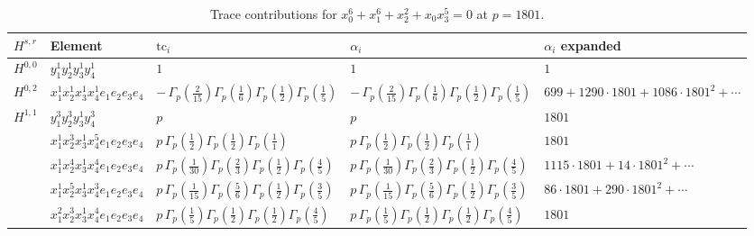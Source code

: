 \documentclass[11pt]{article}
\begin{document}
\begin{table}[ht]
\centering
\caption{Trace contributions for $x_0^{6} + x_1^{6} + x_2^{2} + x_0 x_3^{5} = 0$ at $p=1801$.}\label{tab:deformed-3}
\renewcommand{\arraystretch}{1.1}
{\scriptsize
\begin{tabular}{@{}lllll@{}}
\toprule
$H^{s,r}$ & Element & $\mathrm{tc}_i$ & $\alpha_i$ & $\alpha_i$ expanded \\
\midrule
$H^{0,0}$ & $y_{1}^{1} y_{2}^{1} y_{3}^{1} y_{4}^{1}$ & $1$ & $1$ & $1$ \\
\midrule
$H^{0,2}$ & $x_{1}^{1} x_{2}^{1} x_{3}^{1} x_{4}^{1}  e_{1} e_{2} e_{3} e_{4}$ & $- \, \Gamma_p \left( \frac{2}{15} \right) \Gamma_p \left( \frac{1}{6} \right) \Gamma_p \left( \frac{1}{2} \right) \Gamma_p \left( \frac{1}{5} \right)$ & $- \, \Gamma_p \left( \frac{2}{15} \right) \Gamma_p \left( \frac{1}{6} \right) \Gamma_p \left( \frac{1}{2} \right) \Gamma_p \left( \frac{1}{5} \right)$ & $699{+}1290{\cdot}1801{+}1086{\cdot}1801^{2}{+}\cdots$ \\
\midrule
$H^{1,1}$ & $y_{1}^{3} y_{2}^{3} y_{3}^{1} y_{4}^{3}$ & $p \,$ & $p \,$ & $1801$ \\
 & $x_{1}^{1} x_{2}^{3} x_{3}^{1} x_{4}^{5}  e_{1} e_{2} e_{3} e_{4}$ & $p \, \Gamma_p \left( \frac{1}{2} \right) \Gamma_p \left( \frac{1}{2} \right) \Gamma_p \left( \frac{1}{1} \right)$ & $p \, \Gamma_p \left( \frac{1}{2} \right) \Gamma_p \left( \frac{1}{2} \right) \Gamma_p \left( \frac{1}{1} \right)$ & $1801$ \\
 & $x_{1}^{1} x_{2}^{4} x_{3}^{1} x_{4}^{4}  e_{1} e_{2} e_{3} e_{4}$ & $p \, \Gamma_p \left( \frac{1}{30} \right) \Gamma_p \left( \frac{2}{3} \right) \Gamma_p \left( \frac{1}{2} \right) \Gamma_p \left( \frac{4}{5} \right)$ & $p \, \Gamma_p \left( \frac{1}{30} \right) \Gamma_p \left( \frac{2}{3} \right) \Gamma_p \left( \frac{1}{2} \right) \Gamma_p \left( \frac{4}{5} \right)$ & $1115{\cdot}1801{+}14{\cdot}1801^{2}{+}\cdots$ \\
 & $x_{1}^{1} x_{2}^{5} x_{3}^{1} x_{4}^{3}  e_{1} e_{2} e_{3} e_{4}$ & $p \, \Gamma_p \left( \frac{1}{15} \right) \Gamma_p \left( \frac{5}{6} \right) \Gamma_p \left( \frac{1}{2} \right) \Gamma_p \left( \frac{3}{5} \right)$ & $p \, \Gamma_p \left( \frac{1}{15} \right) \Gamma_p \left( \frac{5}{6} \right) \Gamma_p \left( \frac{1}{2} \right) \Gamma_p \left( \frac{3}{5} \right)$ & $86{\cdot}1801{+}290{\cdot}1801^{2}{+}\cdots$ \\
 & $x_{1}^{2} x_{2}^{3} x_{3}^{1} x_{4}^{4}  e_{1} e_{2} e_{3} e_{4}$ & $p \, \Gamma_p \left( \frac{1}{5} \right) \Gamma_p \left( \frac{1}{2} \right) \Gamma_p \left( \frac{1}{2} \right) \Gamma_p \left( \frac{4}{5} \right)$ & $p \, \Gamma_p \left( \frac{1}{5} \right) \Gamma_p \left( \frac{1}{2} \right) \Gamma_p \left( \frac{1}{2} \right) \Gamma_p \left( \frac{4}{5} \right)$ & $1801$ \\

\end{tabular}}
\end{table}
\end{document}
